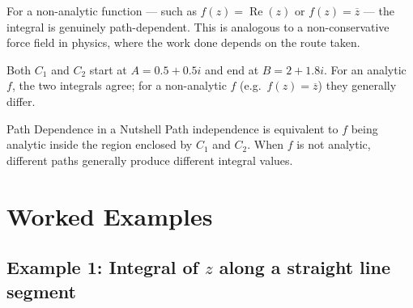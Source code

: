 \documentclass[12pt,a4paper]{article}
\begin{document}
For a non-analytic function --- such as $f(z) = \operatorname{Re}(z)$ or
$f(z) = \overline{z}$ --- the integral is genuinely path-dependent. This is
analogous to a non-conservative force field in physics, where the work done
depends on the route taken.

\begin{center}
\end{center}

Both $C_1$ and $C_2$ start at $A = 0.5 + 0.5i$ and end at $B = 2 + 1.8i$.
For an analytic $f$, the two integrals agree; for a non-analytic $f$ (e.g.\
$f(z) = \overline{z}$) they generally differ.

\begin{learnbox}{Path Dependence in a Nutshell}
Path independence is equivalent to $f$ being analytic inside the region
enclosed by $C_1$ and $C_2$. When $f$ is not analytic, different paths
generally produce different integral values.
\end{learnbox}

\section{Worked Examples}

\subsection*{Example 1: Integral of $z$ along a straight line segment}
\end{document}
